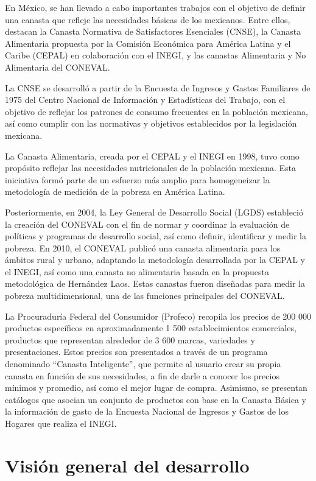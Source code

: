 \documentclass{article}
\begin{document}
En México, se han llevado a cabo importantes trabajos con el objetivo de definir una canasta que refleje las necesidades básicas de los mexicanos. Entre ellos, destacan la Canasta Normativa de Satisfactores Esenciales (CNSE), la Canasta Alimentaria propuesta por la Comisión Económica para América Latina y el Caribe (CEPAL) en colaboración con el INEGI, y las canastas Alimentaria y No Alimentaria del CONEVAL.

La CNSE se desarrolló a partir de la Encuesta de Ingresos y Gastos Familiares de 1975 del Centro Nacional de Información y Estadísticas del Trabajo, con el objetivo de reflejar los patrones de consumo frecuentes en la población mexicana, así como cumplir con las normativas y objetivos establecidos por la legislación mexicana.

La Canasta Alimentaria, creada por el CEPAL y el INEGI en 1998, tuvo como propósito reflejar las necesidades nutricionales de la población mexicana. Esta iniciativa formó parte de un esfuerzo más amplio para homogeneizar la metodología de medición de la pobreza en América Latina.

Posteriormente, en 2004, la Ley General de Desarrollo Social (LGDS) estableció la creación del CONEVAL con el fin de normar y coordinar la evaluación de políticas y programas de desarrollo social, así como definir, identificar y medir la pobreza. En 2010, el CONEVAL publicó una canasta alimentaria para los ámbitos rural y urbano, adaptando la metodología desarrollada por la CEPAL y el INEGI, así como una canasta no alimentaria basada en la propuesta metodológica de Hernández Laos. Estas canastas fueron diseñadas para medir la pobreza multidimensional, una de las funciones principales del CONEVAL.

La Procuraduría Federal del Consumidor (Profeco) recopila los precios de 200 000 productos específicos en aproximadamente 1 500 establecimientos comerciales, productos que representan alrededor de 3 600 marcas, variedades y presentaciones. Estos precios son presentados a través de un programa denominado “Canasta Inteligente”, que permite al usuario crear su propia canasta en función de sus necesidades, a fin de darle a conocer los precios mínimos y promedio, así como el mejor lugar de compra. Asimismo, se presentan catálogos que asocian un conjunto de productos con base en la Canasta Básica y la información de gasto de la Encuesta Nacional de Ingresos y Gastos de los Hogares que realiza el INEGI. 

\section{Visión general del desarrollo}
\end{document}
